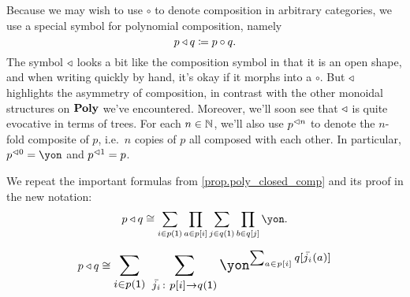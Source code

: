 \documentclass[Book-Poly]{subfiles}
\begin{document}
Because we may wish to use $\circ$ to denote composition in arbitrary categories, we use a special symbol for polynomial composition, namely
\[
p\mathbin{\triangleleft} q\coloneqq p\circ q.
\]
The symbol $\mathbin{\triangleleft}$ looks a bit like the composition symbol in that it is an open shape, and when writing quickly by hand, it's okay if it morphs into a $\circ$.
But $\mathbin{\triangleleft}$ highlights the asymmetry of composition, in contrast with the other monoidal structures on $\mathbf{Poly}$ we've encountered.
Moreover, we'll soon see that $\mathbin{\triangleleft}$ is quite evocative in terms of trees.
For each $n\in\mathbb{N}$, we'll also use $p^{\lhd n}$ to denote the $n$-fold composite of $p$, i.e.\ $n$ copies of $p$ all composed with each other.
In particular, $p\tripow{0}=\yon$ and $p^{\lhd 1}=p$.

We repeat the important formulas from \cref{prop.poly_closed_comp} and its proof in the new notation:
\begin{equation}\label{eqn.composite_formula}
p\tri q\iso\sum_{i\in p(\1)}\prod_{a\in p[i]}\sum_{j\in q(\1)}\prod_{b\in q[j]}\yon.
\end{equation}

\begin{align}\label{eqn.composite_formula_sums_first}
  p\tri q\iso
  \scalebox{1.3}{$\displaystyle
  \sum_{i\in p(\1)} \; \sum_{\bar{j_i}\colon p[i]\to q(\1)}\yon^{\sum_{a\in p[i]}q[\bar{j_i}(a)]}$}
\end{align}

\end{document}
